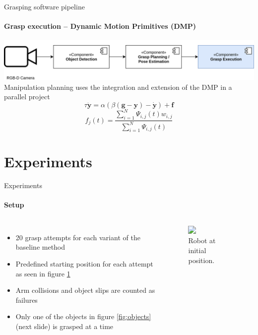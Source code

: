 \documentclass{beamer}
\begin{document}
\begin{frame}{Grasping software pipeline}
    \framesubtitle{Grasp execution -- Dynamic Motion Primitives (DMP)}
    \includegraphics[width=\linewidth]{grasp_pipeline_execution}
    Manipulation planning uses the integration and extension of the DMP in a parallel project \cite{Padalkar2018}
    \begin{equation*}
        \tau \ddot{\mathbf{y}} = \alpha(\beta(\mathbf{g} - \mathbf{y}) - \dot{\mathbf{y}}) + \mathbf{f}
    \end{equation*}
    \begin{equation*}
        f_j(t) = \frac{\sum_{i=1}^{N}\Psi_{i,j}(t)w_{i,j}}{\sum_{i=1}^{N}\Psi_{i,j}(t)}
    \end{equation*}
\end{frame}

\section{Experiments}
\begin{frame}{Experiments}
\framesubtitle{Setup}
    \begin{columns}[onlytextwidth]
        \begin{itemize}
            \footnotesize
            \item 20 grasp attempts for each variant of the baseline method
            \item Predefined starting position for each attempt as seen in figure \ref{fig:exp_setup}
            \item Arm collisions and object slips are counted as failures
            \item Only one of the objects in figure \ref{fig:objects} (next slide) is grasped at a time
        \end{itemize}
        \begin{figure}[b]
            \includegraphics<1->[width=\textwidth]{experimental_setup}
            \caption{\small Robot at initial position.}
            \label{fig:exp_setup}
        \end{figure}
    \end{columns}
\end{frame}
\end{document}
